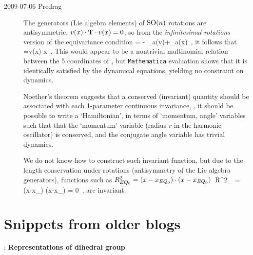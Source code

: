 \begin{description}
\item[2009-07-06  Predrag]
The generators (Lie algebra elements) of $\textrm{SO}(n)$ rotations
are antisymmetric,
$v(x)\cdot \mathbf{T} \cdot v(x)=0$, so from the {\em infinitesimal
rotations} version of the equivariance condition
 = - \groupTan_{a}(v)+\Mvar \groupTan_{a}(x)
\,,
\label{eq:InfnmslRot}
\eeq
it follows that
=v(x) \cdot {} \cdot \Lg \cdot x
\,.
\label{eq:ObscurIdnt}
\eeq
This would appear to be a nontrivial multinomial relation between
the 5 coordinates of \cLe, but \texttt{Mathematica}
evaluation shows that it is identically satisfied by the
dynamical equations, yielding no constraint on dynamics.

Noether's theorem suggests that a conserved (invariant) quantity should
be associated with each 1-parameter continuous invariance,
\ie, it should be possible to write a `Hamiltonian', in terms of
`momentum, angle' variables such that that the `momentum' variable
(radius $r$ in the harmonic oscillator)
is conserved, and the conjugate angle variable has trivial dynamics.

We do not know how to construct such invariant function,
but due to the length conservation under rotations
(antisymmetry of the  Lie algebra generators),
functions such as
$R^2_{EQ_{0}} = (x-x_{EQ_{0}}) \cdot (x-x_{EQ_{0}}) $\,
\beq
{} R^2_{}
   = (x-x_{}) \cdot \Lg \cdot (x-x_{})
  = 0
\,,
are invariant.

\end{description}


\section{Snippets from older blogs}

: {\bf Representations of dihedral group}

